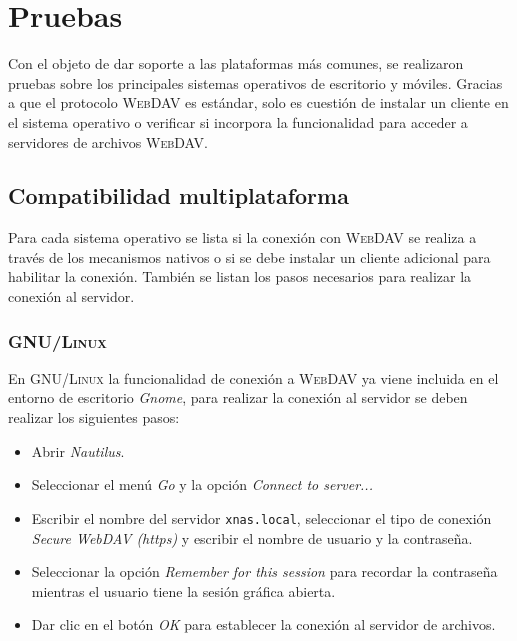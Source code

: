 {
  \linespread{1}
  \cleardoublepage  
  \chapter{Pruebas}
  \label{chap:cap4}
}

Con el objeto de dar soporte a las plataformas m\'{a}s comunes, se realizaron pruebas sobre los principales sistemas operativos de escritorio y m\'{o}viles. Gracias a que el protocolo \textsc{WebDAV} es est\'{a}ndar, solo es cuesti\'{o}n de instalar un cliente en el sistema operativo o verificar si incorpora la funcionalidad para acceder a servidores de archivos \textsc{WebDAV}.

    \section {Compatibilidad multiplataforma}

Para cada sistema operativo se lista si la conexi\'{o}n con \textsc{WebDAV} se realiza a trav\'{e}s de los mecanismos nativos o si se debe instalar un cliente adicional para habilitar la conexi\'{o}n. Tambi\'{e}n se listan los pasos necesarios para realizar la conexi\'{o}n al servidor.

      \subsection {\textsc{GNU/Linux}}

En \textsc{GNU/Linux} la funcionalidad de conexi\'{o}n a \textsc{WebDAV} ya viene incluida en el entorno de escritorio \textit{Gnome}, para realizar la conexi\'{o}n al servidor se deben realizar los siguientes pasos:

\begin{itemize}
  \item Abrir \textsl{Nautilus}.
  \item Seleccionar el men\'{u} \textsl{Go} y la opci\'{o}n \textsl{Connect to server...}
  \item Escribir el nombre del servidor \texttt{xnas.local}, seleccionar el tipo de conexi\'{o}n \textsl{Secure WebDAV (https)} y escribir el nombre de usuario y la contrase\~{n}a.
  \item Seleccionar la opci\'{o}n \textsl{Remember for this session} para recordar la contrase\~{n}a mientras el usuario tiene la sesi\'{o}n gr\'{a}fica abierta.
  \item Dar clic en el bot\'{o}n \textsl{OK} para establecer la conexi\'{o}n al servidor de archivos.
\end{itemize}

